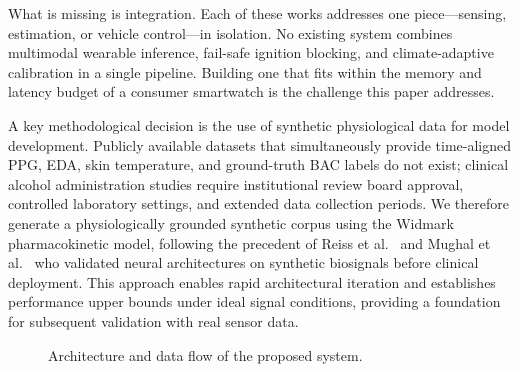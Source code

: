 \documentclass[HARVARD,Times2COL]{WileyNJDv5} %
\providecommand{\DIFadd}[1]{{\protect\color{red} #1}} %
\providecommand{\DIFaddbegin}{} %
\providecommand{\DIFaddend}{} %
\providecommand{\DIFdelbegin}{} %
\providecommand{\DIFdelend}{} %
\providecommand{\DIFscaledelfig}{0.5}
\newlength{\DIFdelgraphicswidth} %
\newlength{\DIFdelgraphicsheight} %
\providecommand{\DIFaddincludegraphics}[2][]{{\color{blue}\fbox{\DIFOincludegraphics[#1]{#2}}}} %
\providecommand{\DIFdelincludegraphics}[2][]{%
\sbox{\DIFdelgraphicsbox}{\DIFOincludegraphics[#1]{#2}}%
\settoboxwidth{\DIFdelgraphicswidth}{\DIFdelgraphicsbox} %
\settoboxtotalheight{\DIFdelgraphicsheight}{\DIFdelgraphicsbox} %
\scalebox{\DIFscaledelfig}{%
\parbox[b]{\DIFdelgraphicswidth}{\usebox{\DIFdelgraphicsbox}\\[-\baselineskip] \rule{\DIFdelgraphicswidth}{0em}}\llap{\resizebox{\DIFdelgraphicswidth}{\DIFdelgraphicsheight}{%
\setlength{\unitlength}{\DIFdelgraphicswidth}%
\begin{picture}(1,1)%
\thicklines\linethickness{2pt} %
{\color[rgb]{1,0,0}\put(0,0){\framebox(1,1){}}}%
{\color[rgb]{1,0,0}\put(0,0){\line( 1,1){1}}}%
{\color[rgb]{1,0,0}\put(0,1){\line(1,-1){1}}}%
\end{picture}%
}\hspace*{3pt}}} %
} %
\DeclareRobustCommand{\DIFaddbegin}{\DIFOaddbegin \let\includegraphics\DIFaddincludegraphics} %
\DeclareRobustCommand{\DIFaddend}{\DIFOaddend \let\includegraphics\DIFOincludegraphics} %
\DeclareRobustCommand{\DIFdelbegin}{\DIFOdelbegin \let\includegraphics\DIFdelincludegraphics} %
\DeclareRobustCommand{\DIFdelend}{\DIFOaddend \let\includegraphics\DIFOincludegraphics} %
\begin{document}
\DIFdelbegin %
\DIFdelend \DIFaddbegin \DIFadd{What is missing is integration. Each of these works addresses one piece---sensing, estimation, or vehicle control---in isolation. No existing system combines multimodal wearable inference, fail-safe ignition blocking, and climate-adaptive calibration in a single pipeline. Building one that fits within the memory and latency budget of a consumer smartwatch is the challenge this paper addresses.
}

\DIFadd{A key methodological decision is the use of synthetic physiological data for model development. Publicly available datasets that simultaneously provide time-aligned PPG, EDA, skin temperature, and ground-truth BAC labels do not exist; clinical alcohol administration studies require institutional review board approval, controlled laboratory settings, and extended data collection periods. We therefore generate a physiologically grounded synthetic corpus using the Widmark pharmacokinetic model, following the precedent of Reiss et al.~\citep{reiss2019} and Mughal et al.~\citep{mughal2025} who validated neural architectures on synthetic biosignals before clinical deployment. This approach enables rapid architectural iteration and establishes performance upper bounds under ideal signal conditions, providing a foundation for subsequent validation with real sensor data.
}\DIFaddend \par
\begin{figure}[t]
\centering

\caption{Architecture and data flow of the proposed system.}
\label{fig:system}
\end{figure}
\end{document}
